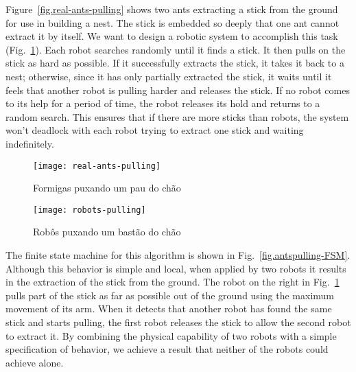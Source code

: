 Figure~\ref{fig.real-ants-pulling} shows two ants extracting a stick from the ground for use in building a nest. The stick is embedded so deeply that one ant cannot extract it by itself. We want to design a robotic system to accomplish this task (Fig.~\ref{fig.robots-pulling}). Each robot searches randomly until it finds a stick. It then pulls on the stick as hard as possible. If it successfully extracts the stick, it takes it back to a nest; otherwise, since it has only partially extracted the stick, it waits until it feels that another robot is pulling harder and releases the stick. If no robot comes to its help for a period of time, the robot releases its hold and returns to a random search. This ensures that if there are more sticks than robots, the system won't deadlock with each robot trying to extract one stick and waiting indefinitely.
\begin{figure}
\begin{minipage}{.45\textwidth}
\texttt{[image: real-ants-pulling]}
\caption{Formigas puxando um pau do chão}
\label{fig.real-ants-pulling}
\end{minipage}
\hspace{\fill}
\begin{minipage}{.45\textwidth}
\texttt{[image: robots-pulling]}
\caption{Robôs puxando um bastão do chão}
\label{fig.robots-pulling}
\end{minipage}
\end{figure}


The finite state machine for this algorithm is shown in Fig.~\ref{fig.antspulling-FSM}. Although this behavior is simple and local, when applied by two robots it results in the extraction of the stick from the ground. The robot on the right in Fig.~\ref{fig.robots-pulling} pulls part of the stick as far as possible out of the ground using the maximum movement of its arm. When it detects that another robot has found the same stick and starts pulling, the first robot releases the stick to allow the second robot to extract it. By combining the physical capability of two robots with a simple specification of behavior, we achieve a result that neither of the robots could achieve alone.

